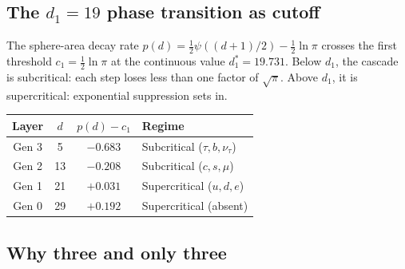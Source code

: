 \documentclass[12pt,a4paper]{article}
\begin{document}
\subsection{The \texorpdfstring{$d_1=19$}{d\_1=19} phase transition as cutoff}

The sphere-area decay rate $p(d)=\tfrac{1}{2}\psi((d+1)/2)-\tfrac{1}{2}\ln\pi$ crosses
the first threshold $c_1=\tfrac{1}{2}\ln\pi$ at the continuous value $d^*_1=19.731$.
Below $d_1$, the cascade is subcritical: each step loses less than one factor of $\sqrt{\pi}$.
Above $d_1$, it is supercritical: exponential suppression sets in.

\begin{center}
\begin{tabular}{cccl}
\toprule
Layer & $d$ & $p(d)-c_1$ & Regime \\
\midrule
Gen 3 & 5  & $-0.683$ & Subcritical ($\tau,b,\nu_\tau$) \\
Gen 2 & 13 & $-0.208$ & Subcritical ($c,s,\mu$) \\
Gen 1 & 21 & $+0.031$ & Supercritical ($u,d,e$) \\
Gen 0 & 29 & $+0.192$ & Supercritical (absent) \\
\bottomrule
\end{tabular}
\end{center}

\subsection{Why three and only three}
\end{document}
